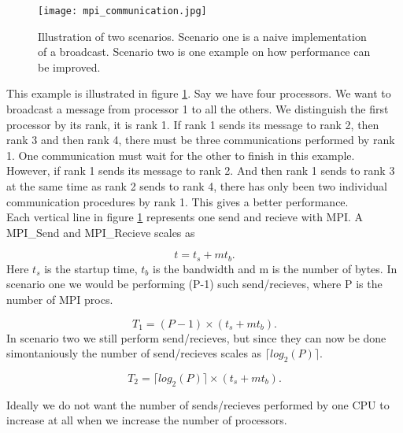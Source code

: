 \begin{figure}[ht!]
\centering
\texttt{[image: mpi\_communication.jpg]}
\caption{Illustration of two scenarios. Scenario one is a naive implementation of a broadcast. Scenario two is one example on how performance can be improved.}
\label{mpi_communication_illustration_thingy}
\end{figure}

This example is illustrated in figure \ref{mpi_communication_illustration_thingy}. Say we have four processors. We want to broadcast a message from processor 1 to all the others. We distinguish the first processor by its rank, it is rank 1. If rank 1 sends its message to rank 2, then rank 3 and then rank 4, there must be three communications performed by rank 1. One communication must wait for the other to finish in this example. \\

However, if rank 1 sends its message to rank 2. And then rank 1 sends to rank 3 at the same time as rank 2 sends to rank 4, there has only been two individual communication procedures by rank 1. This gives a better performance. \\

Each vertical line in figure \ref{mpi_communication_illustration_thingy} represents one send and recieve with MPI. A MPI\_Send and MPI\_Recieve scales as

\begin{equation}
t = t_s + m t_b .
\end{equation}
Here $t_s$ is the startup time, $t_b$ is the bandwidth and m is the number of bytes. In scenario one we would be performing (P-1) such send/recieves, where P is the number of MPI procs.

\begin{equation}
T_1 = (P-1) \times (t_s + m t_b) .
\end{equation}
In scenario two we still perform send/recieves, but since they can now be done simontaniously the number of send/recieves scales as $\lceil log_2(P) \rceil$.

\begin{equation}
T_2 = \lceil log_2(P) \rceil \times (t_s + m t_b) .
\end{equation}

Ideally we do not want the number of sends/recieves performed by one CPU to increase at all when we increase the number of processors. \\

\newpage

